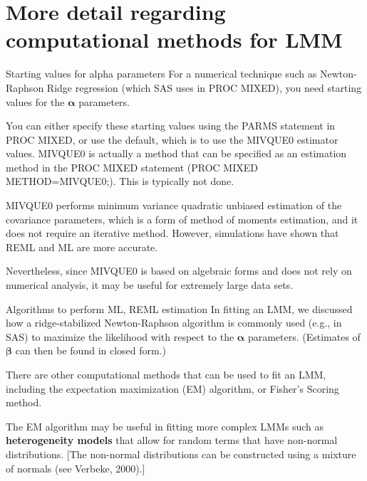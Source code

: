 \documentclass[
  9pt,
  ignorenonframetext,
]{beamer}
\begin{document}
\hypertarget{more-detail-regarding-computational-methods-for-lmm}{%
\section{More detail regarding computational methods for
LMM}\label{more-detail-regarding-computational-methods-for-lmm}}

\begin{frame}{Starting values for alpha parameters}
\protect\hypertarget{starting-values-for-alpha-parameters}{}
For a numerical technique such as Newton-Raphson Ridge regression (which
SAS uses in PROC MIXED), you need starting values for the
\(\pmb \alpha\) parameters.

You can either specify these starting values using the PARMS statement
in PROC MIXED, or use the default, which is to use the MIVQUE0 estimator
values. MIVQUE0 is actually a method that can be specified as an
estimation method in the PROC MIXED statement (PROC MIXED
METHOD=MIVQUE0;). This is typically not done.

MIVQUE0 performs minimum variance quadratic unbiased estimation of the
covariance parameters, which is a form of method of moments estimation,
and it does not require an iterative method. However, simulations have
shown that REML and ML are more accurate.

Nevertheless, since MIVQUE0 is based on algebraic forms and does not
rely on numerical analysis, it may be useful for extremely large data
sets.
\end{frame}

\begin{frame}{Algorithms to perform ML, REML estimation}
\protect\hypertarget{algorithms-to-perform-ml-reml-estimation}{}
In fitting an LMM, we discussed how a ridge-stabilized Newton-Raphson
algorithm is commonly used (e.g., in SAS) to maximize the likelihood
with respect to the \(\pmb \alpha\) parameters. (Estimates of
\(\pmb \beta\) can then be found in closed form.)

There are other computational methods that can be used to fit an LMM,
including the expectation maximization (EM) algorithm, or Fisher's
Scoring method.

The EM algorithm may be useful in fitting more complex LMMs such as
\textbf{heterogeneity models} that allow for random terms that have
non-normal distributions. {[}The non-normal distributions can be
constructed using a mixture of normals (see Verbeke, 2000).{]}
\end{frame}
\end{document}
